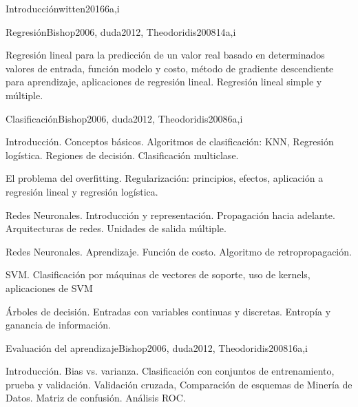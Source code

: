 \begin{syllabus}
\begin{unit}{Introducción}{}{witten2016}{6}{a,i}
\end{unit}

\begin{unit}{Regresión}{}{Bishop2006, duda2012, Theodoridis2008}{14}{a,i}
\begin{topics}
      \item Regresión lineal para la predicción de un valor real basado en determinados valores de entrada, función modelo y costo, método de gradiente descendiente para aprendizaje, aplicaciones de regresión lineal. Regresión lineal simple y múltiple.
    \end{topics}

\end{unit}

\begin{unit}{Clasificación}{}{Bishop2006, duda2012, Theodoridis2008}{6}{a,i}
\begin{topics}
      \item Introducción. Conceptos básicos. Algoritmos de clasificación: KNN, Regresión logística. Regiones de decisión. Clasificación multiclase.
      \item El problema del overfitting. Regularización: principios, efectos, aplicación a regresión lineal y regresión logística.
      \item Redes Neuronales. Introducción y representación. Propagación hacia adelante. Arquitecturas de redes. Unidades de salida múltiple.
      \item Redes Neuronales. Aprendizaje. Función de costo. Algoritmo de retropropagación.
      \item SVM. Clasificación por máquinas de vectores de soporte, uso de kernels, aplicaciones de SVM
      \item Árboles de decisión. Entradas con variables continuas y discretas. Entropía y ganancia de información.

\end{topics}

\end{unit}

\begin{unit}{Evaluación del aprendizaje}{}{Bishop2006, duda2012, Theodoridis2008}{16}{a,i}
\begin{topics}
      \item Introducción. Bias vs. varianza. Clasificación con conjuntos de entrenamiento, prueba y validación. Validación cruzada, Comparación de esquemas de Minería de Datos. Matriz de confusión. Análisis ROC.
   \end{topics}


\end{unit}
\end{syllabus}
